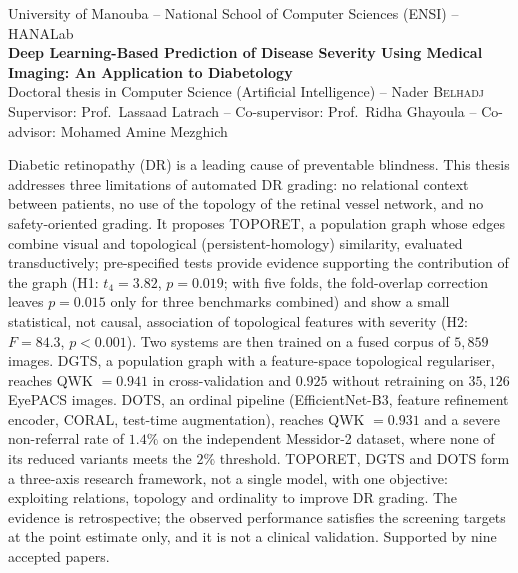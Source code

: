 \documentclass[11pt,a4paper]{article}
\newcommand{\sect}[1]{\par\vspace{5pt}{\color{navy}\bfseries\large #1}\par\vspace{1pt}{\color{navy}\hrule height 0.6pt}\vspace{4pt}}
\begin{document}
\begin{center}
{\small University of Manouba -- National School of Computer Sciences (ENSI) -- HANALab}\\[3pt]
{\large\bfseries\color{navy} Deep Learning-Based Prediction of Disease Severity Using Medical
Imaging: An Application to Diabetology}\\[3pt]
{\small Doctoral thesis in Computer Science (Artificial Intelligence) -- Nader \textsc{Belhadj}\\
Supervisor: Prof.\ Lassaad Latrach -- Co-supervisor: Prof.\ Ridha Ghayoula -- Co-advisor: Mohamed Amine Mezghich}
\end{center}

\sect{Summary}
Diabetic retinopathy (DR) is a leading cause of preventable blindness. This thesis addresses
three limitations of automated DR grading: no relational context between patients, no use
of the topology of the retinal vessel network, and no safety-oriented grading. It proposes TOPORET,
a population graph whose edges combine visual and topological (persistent-homology)
similarity, evaluated transductively; pre-specified tests provide evidence supporting the
contribution of the graph (H1: $t_4=3.82$, $p=0.019$; with five folds, the fold-overlap
correction leaves $p=0.015$ only for three benchmarks combined) and show a small
statistical, not causal, association of topological features with severity (H2:
$F=84.3$, $p<0.001$). Two systems are then trained on a fused corpus of $5{,}859$ images. DGTS, a
population graph with a feature-space topological regulariser, reaches QWK $=0.941$ in
cross-validation and $0.925$ without retraining on $35{,}126$ EyePACS images. DOTS, an
ordinal pipeline (EfficientNet-B3, feature refinement encoder, CORAL, test-time
augmentation), reaches QWK $=0.931$ and a severe non-referral rate of $1.4\%$ on the
independent Messidor-2 dataset, where none of its reduced variants meets the $2\%$ threshold.
TOPORET, DGTS and DOTS form a three-axis research framework, not a single model, with one
objective: exploiting relations, topology and ordinality to improve DR grading. The
evidence is retrospective; the observed performance satisfies the screening targets at the
point estimate only, and it is not a clinical validation. Supported by nine accepted papers.
\end{document}
